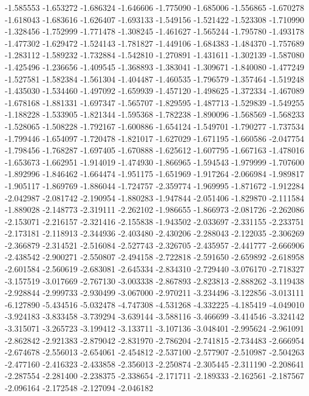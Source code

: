 -1.585553
-1.653272
-1.686324
-1.646606
-1.775090
-1.685006
-1.556865
-1.670278
-1.618043
-1.683616
-1.626407
-1.693133
-1.549156
-1.521422
-1.523308
-1.710990
-1.328456
-1.752999
-1.771478
-1.308245
-1.461627
-1.565244
-1.795780
-1.493178
-1.477302
-1.629472
-1.524143
-1.781827
-1.449106
-1.684383
-1.484370
-1.757689
-1.283112
-1.589232
-1.732884
-1.542810
-1.270891
-1.431611
-1.302139
-1.587080
-1.425496
-1.236656
-1.409545
-1.368893
-1.383041
-1.309671
-1.840080
-1.477249
-1.527581
-1.582384
-1.561304
-1.404487
-1.460535
-1.796579
-1.357464
-1.519248
-1.435030
-1.534460
-1.497092
-1.659939
-1.457120
-1.498625
-1.372334
-1.467089
-1.678168
-1.881331
-1.697347
-1.565707
-1.829595
-1.487713
-1.529839
-1.549255
-1.188228
-1.533905
-1.821344
-1.595368
-1.782238
-1.890096
-1.568569
-1.568233
-1.528065
-1.508228
-1.792167
-1.600886
-1.654124
-1.549701
-1.790277
-1.737534
-1.799446
-1.654097
-1.720478
-1.821017
-1.627029
-1.671195
-1.660586
-2.047754
-1.798456
-1.768287
-1.697405
-1.670888
-1.625612
-1.607795
-1.667163
-1.478016
-1.653673
-1.662951
-1.914019
-1.474930
-1.866965
-1.594543
-1.979999
-1.707600
-1.892996
-1.846462
-1.664474
-1.951175
-1.651969
-1.917264
-2.066984
-1.989817
-1.905117
-1.869769
-1.886044
-1.724757
-2.359774
-1.969995
-1.871672
-1.912284
-2.042987
-2.081742
-2.190954
-1.880283
-1.947844
-2.051406
-1.829870
-2.111584
-1.889028
-2.148773
-2.319111
-2.262102
-1.986655
-1.866973
-2.081726
-2.262086
-2.153071
-2.216157
-2.321416
-2.155838
-1.943502
-2.033697
-2.331155
-2.233751
-2.173181
-2.118913
-2.344936
-2.403480
-2.430206
-2.288043
-2.122035
-2.306269
-2.366879
-2.314521
-2.516084
-2.527743
-2.326705
-2.435957
-2.441777
-2.666906
-2.438542
-2.900271
-2.550807
-2.494158
-2.722818
-2.591650
-2.659892
-2.618958
-2.601584
-2.560619
-2.683081
-2.645334
-2.834310
-2.729440
-3.076170
-2.718327
-3.157519
-3.017669
-2.767130
-3.003338
-2.867893
-2.823813
-2.888262
-3.119438
-2.928844
-2.999733
-2.930499
-3.067000
-2.970211
-3.234496
-3.122856
-3.013111
-6.127890
-5.434516
-5.032478
-4.747308
-4.531268
-4.332225
-4.185419
-4.049010
-3.924183
-3.833458
-3.739294
-3.639144
-3.588116
-3.466699
-3.414546
-3.324142
-3.315071
-3.265723
-3.199412
-3.133711
-3.107136
-3.048401
-2.995624
-2.961091
-2.862842
-2.921383
-2.879042
-2.831970
-2.786204
-2.741815
-2.734483
-2.666954
-2.674678
-2.556013
-2.654061
-2.454812
-2.537100
-2.577907
-2.510987
-2.504263
-2.477160
-2.416323
-2.433858
-2.356013
-2.250874
-2.305445
-2.311190
-2.208641
-2.287554
-2.281400
-2.238375
-2.338654
-2.171711
-2.189333
-2.162561
-2.187567
-2.096164
-2.172548
-2.127094
-2.046182
